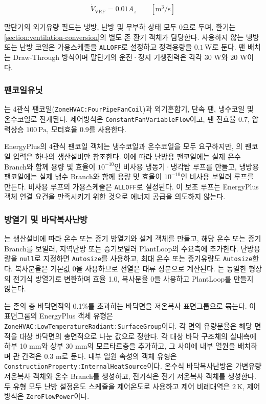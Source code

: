 \begin{equation}
  \dot V_{\mathrm{VRF}} = 0.01 A_z \qquad [\mathrm{m^3/s}]
  \label{eq:vrf-terminal-airflow}
\end{equation}

말단기의 외기유량 필드는 냉방, 난방 및 무부하 상태 모두 0으로 두며, 환기는 \cref{section:ventilation-conversion}의 별도 존 환기 객체가 담당한다. 사용하지 않는 냉방 또는 난방 코일은 가용스케줄을 \texttt{ALLOFF}로 설정하고 정격용량을 $0.1\,\mathrm{W}$로 둔다. 팬 배치는 Draw-Through 방식이며 말단기의 운전·정지 기생전력은 각각 30 W와 20 W이다.

\subsubsection{팬코일유닛}

는 4관식 팬코일(\texttt{ZoneHVAC:FourPipeFanCoil})과 외기혼합기, 단속 팬, 냉수코일 및 온수코일로 전개된다. 제어방식은 \texttt{ConstantFanVariableFlow}이고, 팬 전효율 0.7, 압력상승 $100\,\mathrm{Pa}$, 모터효율 0.9를 사용한다.

EnergyPlus의 4관식 팬코일 객체는 냉수코일과 온수코일을 모두 요구하지만, \simulator 의 팬코일 입력은 하나의 생산설비만 참조한다. 이에 따라 난방용 팬코일에는 실제 온수 Branch와 함께 용량 및 효율이 $10^{-10}$인 비사용 냉동기·냉각탑 루프를 만들고, 냉방용 팬코일에는 실제 냉수 Branch와 함께 용량 및 효율이 $10^{-10}$인 비사용 보일러 루프를 만든다. 비사용 루프의 가용스케줄은 \texttt{ALLOFF}로 설정된다. 이 보조 루프는 EnergyPlus 객체 연결 요건을 만족시키기 위한 것으로 에너지 공급을 의도하지 않는다.

\subsubsection{방열기 및 바닥복사난방}

는 생산설비에 따라 온수 또는 증기 방열기와 설계 객체를 만들고, 해당 온수 또는 증기 Branch를 보일러, 지역난방 또는 증기보일러 PlantLoop의 수요측에 추가한다. 난방용량을 \texttt{null}로 지정하면 \texttt{Autosize}를 사용하고, 최대 온수 또는 증기유량도 \texttt{Autosize}한다. 복사분율은 기본값 0을 사용하므로 전열은 대류 성분으로 계산된다. 는 동일한 형상의 전기식 방열기로 변환하며 효율 1.0, 복사분율 0을 사용하고 PlantLoop를 만들지 않는다.

는 존의 총 바닥면적의 0.1\%를 초과하는 바닥면을 저온복사 표면그룹으로 묶는다. 이 표면그룹의 EnergyPlus 객체 유형은 \texttt{ZoneHVAC:LowTemperatureRadiant:SurfaceGroup}이다. 각 면의 유량분율은 해당 면적을 대상 바닥면의 총면적으로 나눈 값으로 정한다. 각 대상 바닥 구조체의 실내측에 하부 10 mm와 상부 30 mm의 모르타르층을 추가하고, 그 사이에 내부 열원을 배치하며 관 간격은 0.3 m로 둔다. 내부 열원 속성의 객체 유형은 \texttt{ConstructionProperty:InternalHeatSource}이다. 온수식 바닥복사난방은 가변유량 저온복사 객체와 온수 Branch를 생성하고, 전기식은 전기 저온복사 객체를 생성한다. 두 유형 모두 난방 설정온도 스케줄을 제어온도로 사용하고 제어 비례대역은 $2\,\mathrm{K}$, 제어방식은 \texttt{ZeroFlowPower}이다.

